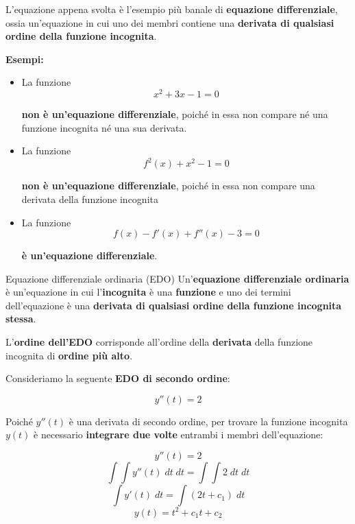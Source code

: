\documentclass[a4paper, 12pt]{report}
\begin{document}
        \quad
        
        L'equazione appena svolta è l'esempio più banale di \textbf{equazione differenziale}, ossia un'equazione in cui uno dei membri contiene una \textbf{derivata di qualsiasi ordine della funzione incognita}.
        
        \textbf{Esempi:}
        \begin{itemize}
            \item La funzione
            \[ x^2+3x-1 = 0\]
            
            \textbf{non è un'equazione differenziale}, poiché in essa non compare né una funzione incognita né una sua derivata.
            
            \item La funzione
            \[ f^2(x)+x^2-1 = 0\]
            
            \textbf{non è un'equazione differenziale}, poiché in essa non compare una derivata della funzione incognita
            
            \item La funzione
            \[ f(x)-f'(x)+f''(x)-3 = 0\]
            
            \textbf{è un'equazione differenziale}.
        \end{itemize}
        
        \quad
        
        \begin{frameddefn}{Equazione differenziale ordinaria (EDO)}
        Un'\textbf{equazione differenziale ordinaria} è un'equazione in cui l'\textbf{incognita} è una \textbf{funzione} e uno dei termini dell'equazione è una \textbf{derivata di qualsiasi ordine della funzione incognita stessa}.
        
        L'\textbf{ordine dell'EDO} corrisponde all'ordine della \textbf{derivata} della funzione incognita di \textbf{ordine più alto}.
        \end{frameddefn}
        
        Consideriamo la seguente \textbf{EDO di secondo ordine}:
        
        \[ y''(t) = 2\]
        
        Poiché $y''(t)$ è una derivata di secondo ordine, per trovare la funzione incognita $y(t)$ è necessario \textbf{integrare due volte} entrambi i membri dell'equazione:
        
        \[ y''(t) = 2\]
        \[ \int \int y''(t) \; dt \; dt = \int \int 2 \; dt \; dt\]
        \[ \int y'(t) \; dt = \int (2t+c_1) \; dt\]
        \[ y(t) = t^2+c_1t+c_2\]
        
\end{document}

